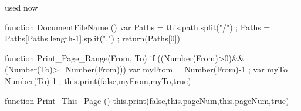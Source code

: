 
 used now 

  function DocumentFileName ()
    { var Paths = this.path.split("/") ;
      Paths = Paths[Paths.length-1].split(".") ;
      return(Paths[0]) }

  function Print_Page_Range(From, To) %
    { if ((Number(From)>0)&&(Number(To)>=Number(From))) 
        { var myFrom = Number(From)-1 ; 
          var myTo = Number(To)-1 ; 
          this.print(false,myFrom,myTo,true) } }

  function Print_This_Page () 
    { this.print(false,this.pageNum,this.pageNum,true) } 

\stopJSpreamble





\endinput
